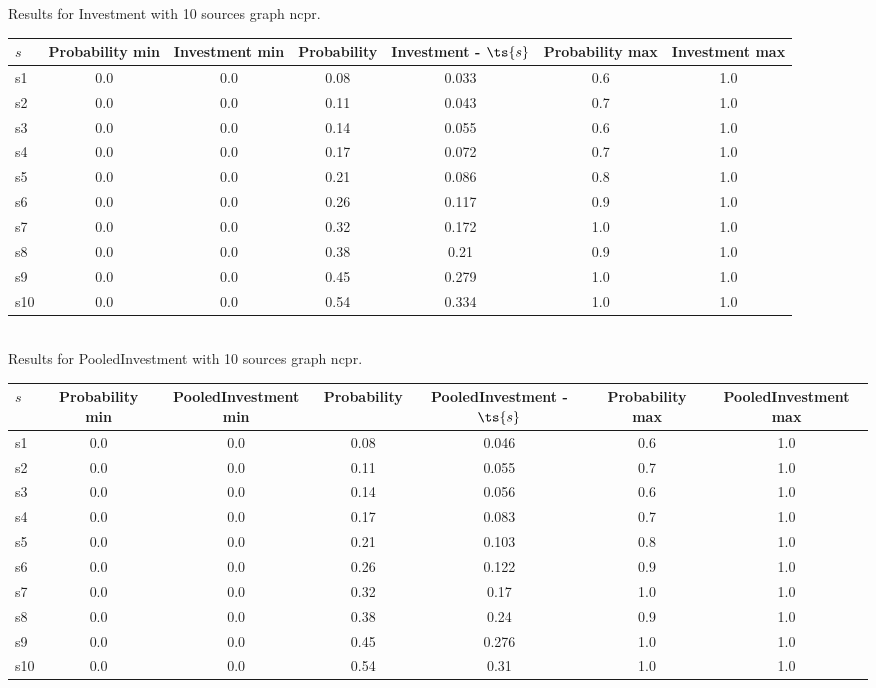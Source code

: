 \documentclass{article}
\begin{document}
\noindent Results for Investment with 10 sources graph ncpr.

\noindent\begin{tabular}{|l|c|c|c|c|c|c|}
\hline
$s$& Probability min & Investment min & Probability & Investment - $\ts{s}$ & Probability max & Investment max\\
\hline
s1 &0.0 & 0.0 & 0.08 & 0.033 & 0.6 & 1.0\\
\hline
s2 &0.0 & 0.0 & 0.11 & 0.043 & 0.7 & 1.0\\
\hline
s3 &0.0 & 0.0 & 0.14 & 0.055 & 0.6 & 1.0\\
\hline
s4 &0.0 & 0.0 & 0.17 & 0.072 & 0.7 & 1.0\\
\hline
s5 &0.0 & 0.0 & 0.21 & 0.086 & 0.8 & 1.0\\
\hline
s6 &0.0 & 0.0 & 0.26 & 0.117 & 0.9 & 1.0\\
\hline
s7 &0.0 & 0.0 & 0.32 & 0.172 & 1.0 & 1.0\\
\hline
s8 &0.0 & 0.0 & 0.38 & 0.21 & 0.9 & 1.0\\
\hline
s9 &0.0 & 0.0 & 0.45 & 0.279 & 1.0 & 1.0\\
\hline
s10 &0.0 & 0.0 & 0.54 & 0.334 & 1.0 & 1.0\\
\hline
\end{tabular}\\

\noindent Results for PooledInvestment with 10 sources graph ncpr.

\noindent\begin{tabular}{|l|c|c|c|c|c|c|}
\hline
$s$& Probability min & PooledInvestment min & Probability & PooledInvestment - $\ts{s}$ & Probability max & PooledInvestment max\\
\hline
s1 &0.0 & 0.0 & 0.08 & 0.046 & 0.6 & 1.0\\
\hline
s2 &0.0 & 0.0 & 0.11 & 0.055 & 0.7 & 1.0\\
\hline
s3 &0.0 & 0.0 & 0.14 & 0.056 & 0.6 & 1.0\\
\hline
s4 &0.0 & 0.0 & 0.17 & 0.083 & 0.7 & 1.0\\
\hline
s5 &0.0 & 0.0 & 0.21 & 0.103 & 0.8 & 1.0\\
\hline
s6 &0.0 & 0.0 & 0.26 & 0.122 & 0.9 & 1.0\\
\hline
s7 &0.0 & 0.0 & 0.32 & 0.17 & 1.0 & 1.0\\
\hline
s8 &0.0 & 0.0 & 0.38 & 0.24 & 0.9 & 1.0\\
\hline
s9 &0.0 & 0.0 & 0.45 & 0.276 & 1.0 & 1.0\\
\hline
s10 &0.0 & 0.0 & 0.54 & 0.31 & 1.0 & 1.0\\
\hline
\end{tabular}\\
\end{document}
